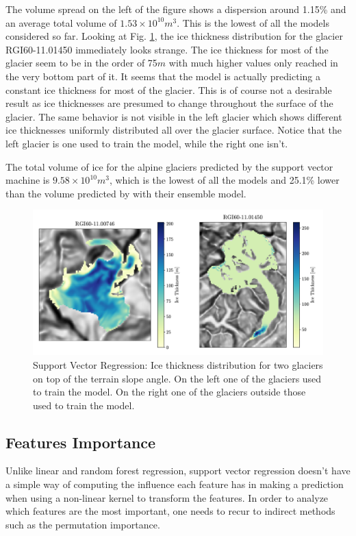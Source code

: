 The volume spread on the left of the figure shows a dispersion around 1.15\% and an average total volume of $1.53 \times 10^{10}m^3$. This is the lowest of all the models considered so far. 
Looking at Fig. \ref{fig:svr-map}, the ice thickness distribution for the glacier RGI60-11.01450 immediately looks strange. The ice thickness for most of the glacier seem to be in the order of 75$m$ with much higher values only reached in the very bottom part of it. It seems that the model is actually predicting a constant ice thickness for most of the glacier. This is of course not a desirable result as ice thicknesses are presumed to change throughout the surface of the glacier. The same behavior is not visible in the left glacier which shows different ice thicknesses uniformly distributed all over the glacier surface. Notice that the left glacier is one used to train the model, while the right one isn't.

The total volume of ice for the alpine glaciers predicted by the support vector machine is $9.58 \times 10^{10}m^3$, which is the lowest of all the models and 25.1\% lower than the volume predicted by \citet{Farinotti2019} with their ensemble model.

\begin{figure}[!tp]
	\centering		  
	\includegraphics[width=1.\textwidth]{figures/SVR_thick_map.pdf}
	\caption{Support Vector Regression: Ice thickness distribution for two glaciers on top of the terrain slope angle. On the left one of the glaciers used to train the model. On the right one of the glaciers outside those used to train the model.}
	\label{fig:svr-map}
\end{figure}

\subsection{Features Importance}\label{svr-features}
Unlike linear and random forest regression, support vector regression doesn't have a simple way of computing the influence each feature has in making a prediction when using a non-linear kernel to transform the features. In order to analyze which features are the most important, one needs to recur to indirect methods such as the permutation importance.

